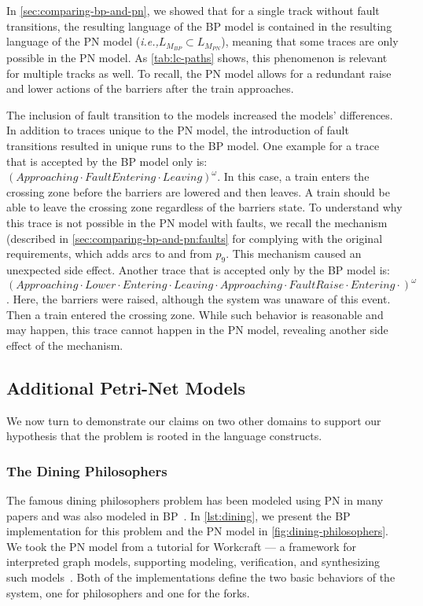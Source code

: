 \documentclass[10pt,journal,compsoc]{IEEEtran}
\theoremstyle{definition}
\newcommand{\ie}{\emph{i.e.,}\xspace}
\begin{document}
In \autoref{sec:comparing-bp-and-pn}, we showed that for a single track without fault transitions, the resulting language of the BP model is contained in the resulting language of the PN model (\ie $L_{M_{BP}} \subset L_{M_{PN}}$), meaning that some traces are only possible in the PN model. As \autoref{tab:lc-paths} shows, this phenomenon is relevant for multiple tracks as well. To recall, the PN model allows for a redundant raise and lower actions of the barriers after the train approaches.

The inclusion of fault transition to the models increased the models' differences. In addition to traces unique to the PN model, the introduction of fault transitions resulted in unique runs to the BP model. One example for a trace that is accepted by the BP model only is:
$( Approaching\cdot  FaultEntering\cdot Leaving)^\omega$.
In this case, a train enters the crossing zone before the barriers are lowered and then leaves. A train should be able to leave the crossing zone regardless of the barriers state. To understand why this trace is not possible in the PN model with faults, we recall the mechanism (described in \autoref{sec:comparing-bp-and-pn:faults} for complying with the original requirements, which adds arcs to and from $p_9$. This mechanism caused an unexpected side effect. Another trace that is accepted only by the BP model is:
$( Approaching\cdot Lower\cdot Entering\cdot Leaving\cdot Approaching\cdot FaultRaise\cdot Entering\cdot)^\omega$. Here, the barriers were raised, although the system was unaware of this event. Then a train entered the crossing zone. While such behavior is reasonable and may happen, this trace cannot happen in the PN model, revealing another side effect of the mechanism.





\subsection{Additional Petri-Net Models}
We now turn to demonstrate our claims on two other domains to support our hypothesis that the problem is rooted in the language constructs.

\subsubsection{The Dining Philosophers}
The famous dining philosophers problem has been modeled using PN in many papers and was also modeled in BP~\cite{harel2011model}. In \autoref{lst:dining}, we present the BP implementation for this problem and the PN model in \autoref{fig:dining-philosophers}. We took the PN model from a tutorial for Workcraft --- a framework for interpreted graph models, supporting modeling, verification, and synthesizing such models~\cite{workcraftDinning, poliakov2009workcraft, sokolov2016workcraft}. Both of the implementations define the two basic behaviors of the system, one for philosophers and one for the forks. 
\end{document}
